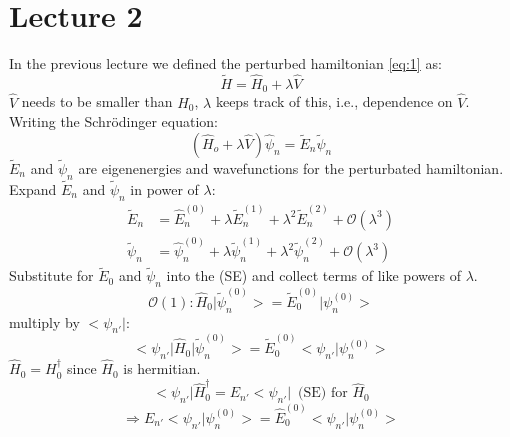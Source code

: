 \documentclass[12pt]{article}
\begin{document}
\section{Lecture 2}
In the previous lecture we defined the perturbed hamiltonian
\ref{eq:1}  as:
\begin{equation*}
  \tilde{H} = \hat{H}_0 + \lambda \hat{V}
\end{equation*}
\noindent
$\hat{V}$ needs to be smaller than $\hat{H}_0$, $\lambda$ keeps track of this, i.e., dependence on $\hat{V}$.
\noindent
\\
Writing the Schr\"odinger equation:
\begin{equation*}
	(\hat{H}_o + \lambda \hat{V}) \hat{\psi}_n = \tilde{E}_n \tilde{\psi}_n
\end{equation*}
$\tilde{E}_n$ and $\tilde{\psi}_n$ are eigenenergies and wavefunctions for the perturbated hamiltonian.
\\
Expand $\tilde{E}_n$ and $\tilde{\psi}_n$ in power of $\lambda$:
\begin{align*}
	\tilde{E}_n & = \hat{E}^{(0)}_n + \lambda \tilde{E}^{(1)}_n + \lambda^2 \tilde{E}^{(2)}_n + \mathcal{O}(\lambda^3)\\
	\tilde{\psi}_n & = \hat{\psi}^{(0)}_n + \lambda \tilde{\psi}^{(1)}_n + \lambda^2 \tilde{\psi}^{(2)}_n + \mathcal{O}(\lambda^3)
\end{align*}
Substitute for $\tilde{E}_0$ and $\tilde{\psi}_n$ into the (SE) and collect terms of like powers of $\lambda$.
\begin{equation*}
	\mathcal{O}(1): \hat{H}_0 \big|\tilde{\psi}^{(0)}_n \big> = \tilde{E}^{(0)}_0 \big| \psi_n^{(0)} \big>
\end{equation*}
multiply by $\big< \psi_{n'}\big|$:
\begin{equation*}
	\big< \psi_{n'}\big|\hat{H}_0 \big|\tilde{\psi}^{(0)}_n \big> = \tilde{E}^{(0)}_0 \big< \psi_{n'}\big| \psi_n^{(0)} \big>
\end{equation*}
$\hat{H}_0 = H_0^\dag$ since $\hat{H}_0$ is hermitian.
\begin{equation*}
	\big < \psi_{n'} \big| \hat{H}^\dag_0 = E_{n'} \big< \psi_{n'} \big|\,\,\,\text{(SE) for } \hat{H}_0
\end{equation*}
\begin{equation*}
	\Longrightarrow E_{n'} \big< \psi_{n'} \big| \psi_n^{(0)} \big> = 
	\hat{E}^{(0)}_0\big< \psi_{n'} \big| \psi_n^{(0)} \big> 
\end{equation*}
\end{document}
